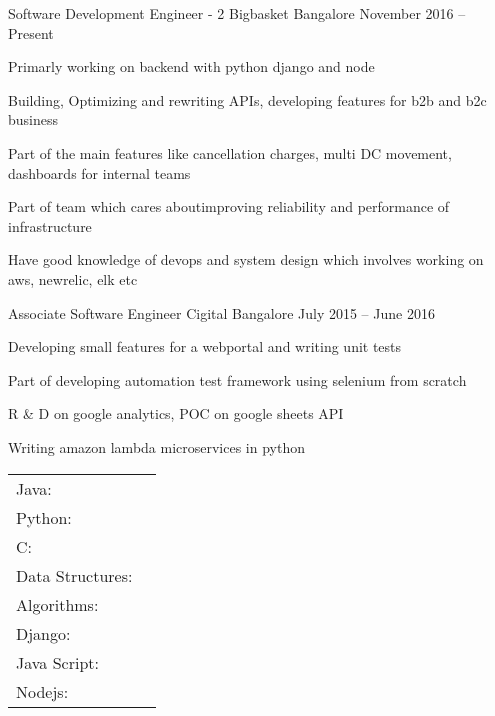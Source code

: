 \documentclass[]{awesome-cv}
\begin{document}
\vspace{-3mm}
\begin{cventries}
	\cventry
	{Software Development Engineer - 2}
	{Bigbasket}
	{Bangalore}
	{November 2016 – Present}
	{\begin{cvitems}
		\item {Primarly working on backend with python django and node}
		\item {Building, Optimizing and rewriting APIs, developing features for b2b and b2c business}
		\item {Part of the main features like cancellation charges, multi DC movement, dashboards for internal teams}
		\item {Part of team which cares aboutimproving reliability and performance of infrastructure}
		\item {Have good knowledge of devops and system design which involves working on aws, newrelic, elk etc}
		\end{cvitems}}
	\cventry
	{Associate Software Engineer}
	{Cigital}
	{Bangalore}
	{July 2015 – June 2016}
	{\begin{cvitems}
		\item {Developing small features for a webportal and writing unit tests}
		\item {Part of developing automation test framework using selenium from scratch}
		\item {R \& D on google analytics, POC on google sheets API}
		\item {Writing amazon lambda microservices in python}
		\end{cvitems}}
\end{cventries}
\vspace{-5mm}
\begin{cventries}
	\cventry
	{}
	{\def\arraystretch{1.15}{\begin{tabular}{ l l }
		Java:  & {\skill{ My favourite programming language}} \\
		Python:  & {\skill{ From where I started learning programming}} \\
		C:  & {\skill{ My first statically typed programming language}} \\
		Data Structures:  & {\skill{ My first love}} \\
		Algorithms:  & {\skill{ With whom I spent most of my time}} \\
		Django:  & {\skill{ My first back-end framework}} \\
		Java Script:  & {\skill{ My first front-end scripting language}} \\
		Nodejs: & {\skill{ Currently learning and exploring in depth}} \\
		\end{tabular}}}
	{}
	{}
	{}
\end{cventries}
\end{document}
